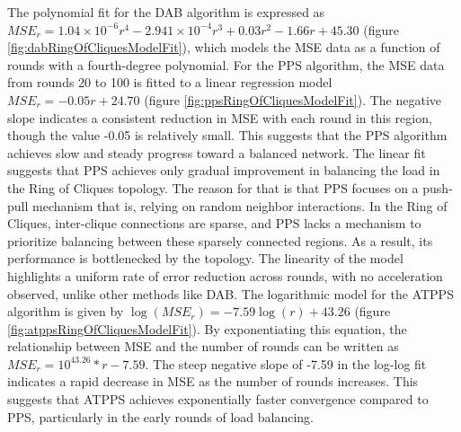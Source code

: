 The polynomial fit for the DAB algorithm is expressed as $MSE_r=1.04\times 10^{-6}r^{4}-2.941\times 10^{-4}r^{3}+0.03r^{2}-1.66r+45.30$ (figure \ref{fig:dabRingOfCliquesModelFit}), which models the MSE data as a function of rounds with a fourth-degree polynomial. For the PPS algorithm, the MSE data from rounds 20 to 100 is fitted to a linear regression model $MSE_r=-0.05r+24.70$ (figure \ref{fig:ppsRingOfCliquesModelFit}). The negative slope indicates a consistent reduction in MSE with each round in this region, though the value -0.05 is relatively small. This suggests that the PPS algorithm achieves slow and steady progress toward a balanced network. The linear fit suggests that PPS achieves only gradual improvement in balancing the load in the Ring of Cliques topology. The reason for that is that PPS focuses on a push-pull mechanism that is, relying on random neighbor interactions. In the Ring of Cliques, inter-clique connections are sparse, and PPS lacks a mechanism to prioritize balancing between these sparsely connected regions. As a result, its performance is bottlenecked by the topology. The linearity of the model highlights a uniform rate of error reduction across rounds, with no acceleration observed, unlike other methods like DAB. The logarithmic model for the ATPPS algorithm is given by $\log{(MSE_r)}=-7.59\log{(r)}+43.26$ (figure \ref{fig:atppsRingOfCliquesModelFit}). By exponentiating this equation, the relationship between MSE and the number of rounds can be written as $MSE_r=10^{43.26}*r-7.59$. The steep negative slope of -7.59 in the log-log fit indicates a rapid decrease in MSE as the number of rounds increases. This suggests that ATPPS achieves exponentially faster convergence compared to PPS, particularly in the early rounds of load balancing.

